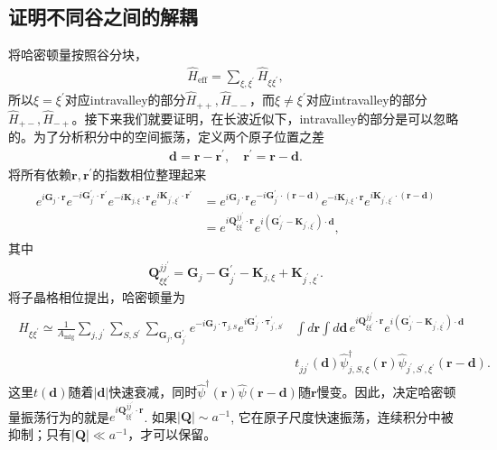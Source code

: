 \documentclass[10pt, oneside]{article}
\begin{document}
\subsection{证明不同谷之间的解耦}
将哈密顿量按照谷分块，
\begin{align}
	\hat{H}_{\mathrm{eff}} = \sum_{\xi,\xi^{\prime}} \hat{H}_{\xi \xi^{\prime}},
\end{align}
所以\(\xi = \xi^{\prime}\)对应intravalley的部分\(\hat{H}_{++}, \hat{H}_{--}\)，而\(\xi \neq \xi^{\prime}\)对应intravalley的部分\(\hat{H}_{+-}, \hat{H}_{-+}\)。接下来我们就要证明，在长波近似下，intravalley的部分是可以忽略的。为了分析积分中的空间振荡，定义两个原子位置之差
\begin{align}
	\bm{d} = \bm{r} - \bm{r}^{\prime},\quad \bm{r}^{\prime} = \bm{r} - \bm{d}.
\end{align}
将所有依赖\(\bm{r}, \bm{r}^{\prime}\)的指数相位整理起来
\begin{align}
	\begin{split}
		e^{i \bm{G}_{j} \cdot \bm{r}} e^{-i \bm{G}^{\prime}_{j^{\prime}} \cdot \bm{r}^{\prime}} e^{-i \bm{K}_{j, \xi} \cdot \bm{r}} e^{i \bm{K}_{j^{\prime}, \xi^{\prime}} \cdot \bm{r}^{\prime}} & = e^{i \bm{G}_{j} \cdot \bm{r}} e^{-i \bm{G}^{\prime}_{j^{\prime}} \cdot \left(\bm{r} - \bm{d}\right)}  e^{-i \bm{K}_{j, \xi} \cdot \bm{r}}  e^{i \bm{K}_{j^{\prime}, \xi^{\prime}} \cdot \left(\bm{r} - \bm{d}\right)} \\
		& = e^{i \bm{Q}_{\xi \xi^{\prime}}^{j j^{\prime}} \cdot \bm{r}} e^{i \left(\bm{G}^{\prime}_{j^{\prime}} - \bm{K}_{j^{\prime}, \xi^{\prime}} \right) \cdot \bm{d}},
	\end{split}
\end{align}
其中
\begin{align}
	\boxed{
		\bm{Q}_{\xi \xi^{\prime}}^{j j^{\prime}}  = \bm{G}_{j} - \bm{G}^{\prime}_{j^{\prime}} - \bm{K}_{j,\xi} + \bm{K}_{j^{\prime},\xi^{\prime}}. 
	}
\end{align}
将子晶格相位提出，哈密顿量为
\begin{align}
	\begin{split}
			\hat{H}_{\xi \xi^{\prime}} \simeq \frac{1}{A_{\mathrm{mlg}}} \sum_{j,j^{\prime}} \sum_{S,S^{\prime}} \sum_{\bm{G}_{j}, \bm{G}^{\prime}_{j^{\prime}}} e^{-i \bm{G}_{j} \cdot \bm{\tau}_{j,S}} e^{i \bm{G}^{\prime}_{j^{\prime}} \cdot \bm{\tau}^{\prime}_{j^{\prime}, S^{\prime}}} & \int d \bm{r}  \int d \bm{d} \, e^{i \bm{Q}_{\xi \xi^{\prime}}^{j j^{\prime}}  \cdot \bm{r}} e^{i \left(\bm{G}^{\prime}_{j^{\prime}} - \bm{K}_{j^{\prime}, \xi^{\prime}} \right) \cdot \bm{d}} \\
			& t_{jj^{\prime}} \left(\bm{d}\right) \hat{\psi}^{\dagger}_{j,S,\xi} \left(\bm{r}\right) \hat{\psi}_{j^{\prime}, S^{\prime}, \xi^{\prime}} \left(\bm{r} - \bm{d}\right).
	\end{split}
\end{align}
这里\(t \left(\bm{d}\right)\)随着\(\left|\bm{d}\right|\)快速衰减，同时\(\hat{\psi}^{\dagger} \left(\bm{r}\right) \hat{\psi} \left(\bm{r} - \bm{d}\right)\)随\(\bm{r}\)慢变。因此，决定哈密顿量振荡行为的就是\(e^{i \bm{Q}_{\xi \xi^{\prime}}^{j j^{\prime}}  \cdot \bm{r}}\). 如果\(\left|\bm{Q}\right| \sim a^{-1}\), 它在原子尺度快速振荡，连续积分中被抑制；只有\(\left|\bm{Q}\right| \ll a^{-1}\)，才可以保留。
\end{document}
